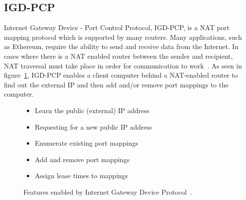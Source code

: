 \subsection{IGD-PCP}
Internet Gateway Device - Port Control Protocol, IGD-PCP, is a NAT port mapping protocol which is supported by many routers. Many applications, such as Ethereum, require the ability to send and receive data from the Internet. In cases where there is a NAT enabled router between the sender and recipient, NAT traversal must take place in order for communication to work~\cite{igd-pcp:rfc}. As seen in figure~\ref{fig:igd}, IGD-PCP enables a client computer behind a NAT-enabled router to find out the external IP and then add and/or remove port mappings to the computer. 

\begin{figure}[H]
\centering
\begin{itemize}
    \item Learn the public (external) IP address
    \item Requesting for a new public IP address
    \item Enumerate existing port mappings
    \item Add and remove port mappings
    \item Assign lease times to mappings
\end{itemize}
\caption{Features enabled by Internet Gateway Device Protocol~\cite{igd-pcp:rfc}.}
\label{fig:igd}
\end{figure}

